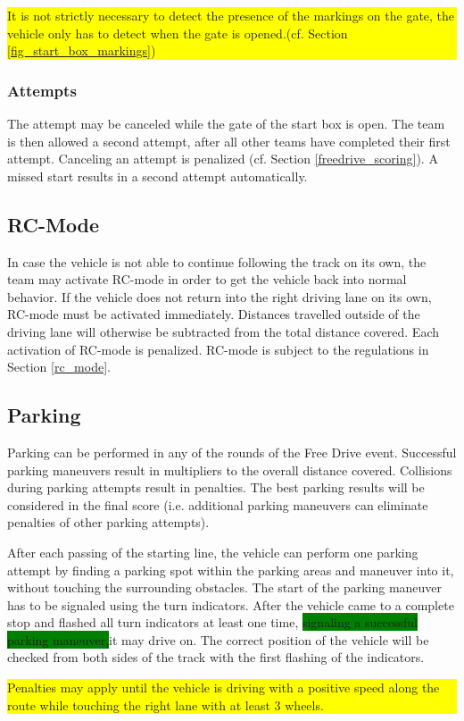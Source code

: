 \documentclass[a4paper]{report}
\newlength\colorboxwidth
\begin{document}
{\colorbox{yellow}{\parbox{\colorboxwidth}{It is not strictly necessary to detect the presence of the markings on the gate, the vehicle only has to detect when the gate is opened.(cf. Section \ref{fig_start_box_markings})}}

\subsubsection{Attempts} 

The attempt may be canceled while the gate of the start box is open. The team is then allowed a second attempt, after all other teams have completed their first attempt. Canceling an attempt is penalized (cf. Section \ref{freedrive_scoring}). A missed start results in a second attempt automatically. 

\subsection{RC-Mode}

In case the vehicle is not able to continue following the track on its own, the team may activate RC-mode in order to get the vehicle back into normal behavior. If the vehicle does not return into the right driving lane on its own, RC-mode must be activated immediately. Distances travelled outside of the driving lane will otherwise be subtracted from the total distance covered. Each activation of RC-mode is penalized. RC-mode is subject to the regulations in Section \ref{rc_mode}. 

\subsection{Parking}

Parking can be performed in any of the rounds of the Free Drive event. Successful parking maneuvers result in multipliers to the overall distance covered. Collisions during parking attempts result in penalties. The best parking results will be considered in the final score (i.e. additional parking maneuvers can eliminate penalties of other parking attempts). 

After each passing of the starting line, the vehicle can perform one parking attempt by finding a parking spot within the parking areas and maneuver into it, without touching the surrounding obstacles. The start of the parking maneuver has to be signaled using the turn indicators. After the vehicle came to a complete stop and flashed all turn indicators at least one time, \colorbox{green}{signaling a successful parking maneuver,}it may drive on. The correct position of the vehicle will be checked from both sides of the track with the first flashing of the indicators. {\colorbox{yellow}{\parbox{\colorboxwidth}{Penalties may apply until the vehicle is driving with a positive speed along the route while touching the right lane with at least 3 wheels.}}

}}
\end{document}
